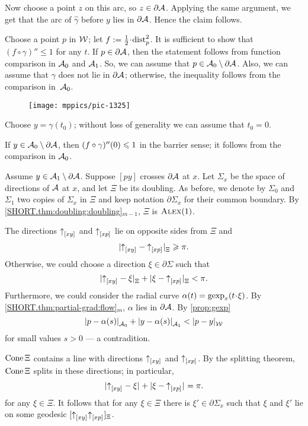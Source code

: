 Now choose a point $z$ on this arc, so $z\in \partial\mathcal{A}$.
Applying the same argument, we get that the arc of $\hat\gamma$ before $y$ lies in $\partial\mathcal{A}$.
Hence the claim follows.\claimqeds

Choose a point $p$ in $\mathcal{W}$;
let $f\df\tfrac12\cdot\distfun_p^2$.
It is sufficient to show that $(f\circ\gamma)''\le 1$ for any $t$.
If $p\in \partial\mathcal{A}$, then the statement follows from function comparison in $\mathcal{A}_0$ and $\mathcal{A}_1$.
So, we can assume that $p\in \mathcal{A}_0\setminus \partial\mathcal{A}$.
Also, we can assume that $\gamma$ does not lie in $\partial \mathcal{A}$;
otherwise, the inequality follows from the comparison in~$\mathcal{A}_0$.

\begin{wrapfigure}{r}{55mm}
\vskip-2mm
\centering
\texttt{[image: mppics/pic-1325]}
\end{wrapfigure}

Choose $y=\gamma(t_0)$; without loss of generality we can assume that $t_0=0$.

If $y\in \mathcal{A}_0\setminus\partial\mathcal{A}$, then $(f\circ\gamma)''(0)\leqslant 1$ in the barrier sense;
it follows from the comparison in $\mathcal{A}_0$.

Assume $y\in \mathcal{A}_1\setminus\partial\mathcal{A}$.
Suppose $[py]$ crosses $\partial\mathcal{A}$ at $x$.
Let $\Sigma_x$ be the space of directions of $\mathcal{A}$ at $x$,
and let $\Xi$ be its doubling.
As before, we denote by $\Sigma_0$ and $\Sigma_1$ two copies of $\Sigma_x$ in  $\Xi$
and keep notation $\partial\Sigma_x$ for their common boundary.
By \ref{SHORT.thm:doubling:doubling}$_{m-1}$, $\Xi$ is $\textsc{Alex}(1)$.

The directions ${\uparrow}_{[{x}{y}]_{{}}}$ and ${\uparrow}_{[{x}{p}]_{{}}}$ lie on opposite sides from $\Xi$ and
\[|{{\uparrow}_{[{x}{y}]_{{}}}}-{{\uparrow}_{[{x}{p}]_{{}}}}|_{\Xi}^{{}}\geqslant \pi.\]
Otherwise, we could choose a direction $\xi\in\partial\Sigma$ such that
\[|{{\uparrow}_{[{x}{y}]_{{}}}}-{\xi}|_{\Xi}^{{}}+|{\xi}-{{\uparrow}_{[{x}{p}]_{{}}}}|_{\Xi}^{{}}<\pi.\]
Furthermore, we could consider the radial curve $\alpha(t)=\gexp_x(t\cdot \xi)$.
By \ref{SHORT.thm:partial-grad:flow}$_m$, $\alpha$ lies in $\partial \mathcal{A}$.
By \ref{prop:gexp}
\[\dist{p}{\alpha(s)}{\spc{A}_0}
+\dist{y}{\alpha(s)}{\spc{A}_1}
<\dist{p}{y}{\spc{W}}\]
for small values $s>0$
--- a contradition.

$\mathop{\rm Cone}\nolimits \Xi$ contains a line with directions ${\uparrow}_{[{x}{y}]_{{}}}$ and ${\uparrow}_{[{x}{p}]_{{}}}$.
By the splitting theorem, $\mathop{\rm Cone}\nolimits \Xi$ splits in these directions;
in particular, 
\[|{{\uparrow}_{[{x}{y}]_{{}}}}-{\xi}|_{}^{{}}+|{\xi}-{{\uparrow}_{[{x}{p}]_{{}}}}|_{}^{{}}=\pi.\]
for any $\xi\in\Xi$.
It follows that for any $\xi\in\Xi$ there is $\xi'\in\partial\Sigma_x$ such that 
$\xi$ and $\xi'$ lie on some geodesic $[{\uparrow}_{[{x}{y}]_{{}}} {\uparrow}_{[{x}{p}]_{{}}}]_\Xi$.

